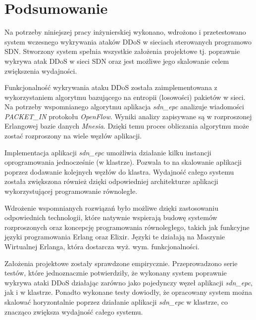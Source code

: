 \chapter{Podsumowanie}

Na potrzeby niniejszej pracy inżynierskiej wykonano, wdrożono i przetestowano
system wczesnego wykrywania ataków DDoS w sieciach sterowanych programowo SDN.
Stworzony system spełnia wszystkie założenia projektowe tj. poprawnie wykrywa
atak DDoS w sieci SDN oraz jest możliwe jego skalowanie celem zwiększenia
wydajności.

Funkcjonalność wykrywania ataku DDoS została zaimplementowana z wykorzystaniem
algorytmu bazującego na entropii (losowości) pakietów w sieci. Na potrzeby
wspomnianego algorytmu aplikacja \textit{sdn\_epc} analizuje wiadomości
\mbox{\textit{PACKET\_IN}} protokołu \textit{OpenFlow}. Wyniki analizy
zapisywane są w rozproszonej Erlangowej bazie danych \textit{Mnesia}. Dzięki
temu proces obliczania algorytmu może zostać rozproszony na wiele węzłów
aplikacji.

Implementacja aplikacji \textit{sdn\_epc} umożliwia działanie kilku instancji
oprogramowania jednocześnie (w klastrze). Pozwala to na skalowanie aplikacji
poprzez dodawanie kolejnych węzłów do klastra. Wydajność całego systemu została
zwiększona również dzięki odpowiedniej architekturze aplikacji wykorzystującej
programowanie równoległe.

Wdrożenie wspomnianych rozwiązań było możliwe dzięki zastosowaniu odpowiednich
technologii, które natywnie wspierają budowę systemów rozproszonych oraz
koncepcję programowania równoległego, takich jak funkcyjne języki programowania Erlang oraz
Elixir. Języki te działają na Maszynie Wirtualnej Erlanga, która dostarcza
wyż. wym. funkcjonalności.

Założenia projektowe zostały sprawdzone empirycznie. Przeprowadzono serie
testów, które jednoznacznie potwierdziły, że wykonany system poprawnie wykrywa
ataki DDoS działając zarówno jako pojedynczy węzeł aplikacji \textit{sdn\_epc},
jak i w klastrze. Ponadto wykonane testy dowiodły, że opracowany system można
skalować horyzontalnie poprzez działanie aplikacji \textit{sdn\_epc} w klastrze,
co znacząco zwiększa wydajność całego systemu.